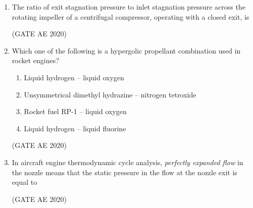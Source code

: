 \documentclass[journal,12pt,onecolumn]{IEEEtran}
\theoremstyle{remark}
\begin{document}
\begin{enumerate}
\item The ratio of exit stagnation pressure to inlet stagnation pressure across the rotating impeller of a centrifugal compressor, operating with a closed exit, is
\begin{enumerate}
\end{enumerate}
\hfill(GATE AE 2020)

\item Which one of the following is a hypergolic propellant combination used in rocket engines?
\begin{enumerate}
        \item Liquid hydrogen -- liquid oxygen
        \item Unsymmetrical dimethyl hydrazine -- nitrogen tetroxide
        \item Rocket fuel RP-1 -- liquid oxygen
        \item Liquid hydrogen -- liquid fluorine
\end{enumerate}
\hfill(GATE AE 2020)

\item In aircraft engine thermodynamic cycle analysis, \textit{perfectly expanded flow} in the nozzle means that the static pressure in the flow at the nozzle exit is equal to
\begin{enumerate}
\end{enumerate}
\hfill(GATE AE 2020)


\end{enumerate}
\end{document}
